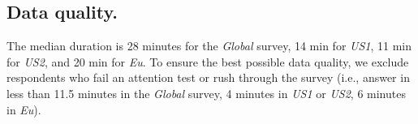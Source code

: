 \begin{small}
\subsection*{\small Data quality.} %
The median duration is 28 minutes for the \textit{Global} survey, 14 min for \textit{US1}, 11 min for \textit{US2}, and 20 min for \textit{Eu}. To ensure the best possible data quality, we exclude respondents who fail an attention test or rush through the survey (i.e., answer in less than 11.5 minutes in the \textit{Global} survey, 4 minutes in \textit{US1} or \textit{US2}, 6 minutes in \textit{Eu}). %




\end{small}
